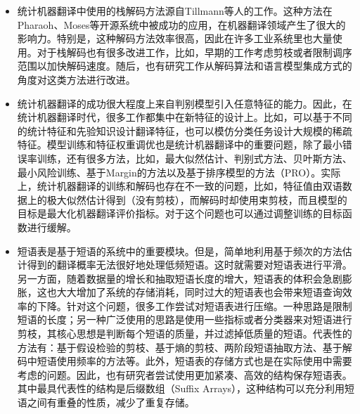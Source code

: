 \begin{itemize}
\vspace{0.5em}
\item 统计机器翻译中使用的栈解码方法源自Tillmann等人的工作。这种方法在Pharaoh、Moses等开源系统中被成功的应用，在机器翻译领域产生了很大的影响力。特别是，这种解码方法效率很高，因此在许多工业系统里也大量使用。对于栈解码也有很多改进工作，比如，早期的工作考虑剪枝或者限制调序范围以加快解码速度。随后，也有研究工作从解码算法和语言模型集成方式的角度对这类方法进行改进。
\vspace{0.5em}
\item 统计机器翻译的成功很大程度上来自判别模型引入任意特征的能力。因此，在统计机器翻译时代，很多工作都集中在新特征的设计上。比如，可以基于不同的统计特征和先验知识设计翻译特征，也可以模仿分类任务设计大规模的稀疏特征。模型训练和特征权重调优也是统计机器翻译中的重要问题，除了最小错误率训练，还有很多方法，比如，最大似然估计、判别式方法、贝叶斯方法、最小风险训练、基于Margin的方法以及基于排序模型的方法（PRO）。实际上，统计机器翻译的训练和解码也存在不一致的问题，比如，特征值由双语数据上的极大似然估计得到（没有剪枝），而解码时却使用束剪枝，而且模型的目标是最大化机器翻译评价指标。对于这个问题也可以通过调整训练的目标函数进行缓解。
\vspace{0.5em}
\item 短语表是基于短语的系统中的重要模块。但是，简单地利用基于频次的方法估计得到的翻译概率无法很好地处理低频短语。这时就需要对短语表进行平滑。另一方面，随着数据量的增长和抽取短语长度的增大，短语表的体积会急剧膨胀，这也大大增加了系统的存储消耗，同时过大的短语表也会带来短语查询效率的下降。针对这个问题，很多工作尝试对短语表进行压缩。一种思路是限制短语的长度；另一种广泛使用的思路是使用一些指标或者分类器来对短语进行剪枝，其核心思想是判断每个短语的质量，并过滤掉低质量的短语。代表性的方法有：基于假设检验的剪枝、基于熵的剪枝、两阶段短语抽取方法、基于解码中短语使用频率的方法等。此外，短语表的存储方式也是在实际使用中需要考虑的问题。因此，也有研究者尝试使用更加紧凑、高效的结构保存短语表。其中最具代表性的结构是后缀数组（Suffix Arrays），这种结构可以充分利用短语之间有重叠的性质，减少了重复存储。
\vspace{0.5em}
\end{itemize}











